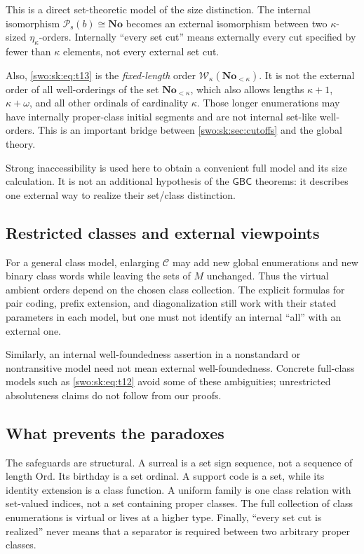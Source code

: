 \documentclass[11pt]{article}
\theoremstyle{definition}
\theoremstyle{remark}
\newcommand{\No}{\mathbf{No}}
\newcommand{\Ord}{\mathrm{Ord}}
\newcommand{\W}{\mathcal W}
\newcommand{\Psupp}{\mathcal P_{\mathrm{s}}}
\newcommand{\GBC}{\mathsf{GBC}}
\begin{document}
This is a direct set-theoretic model of the size distinction. The
internal isomorphism $\Psupp(b)\cong\No$ becomes an external isomorphism
between two $\kappa$-sized $\eta_\kappa$-orders. Internally ``every set
cut'' means externally every cut specified by fewer than $\kappa$
elements, not every external set cut.

Also, \eqref{swo:sk:eq:t13} is the \emph{fixed-length} order
$\W_\kappa(\No_{<\kappa})$. It is not the external order of all
well-orderings of the set $\No_{<\kappa}$, which also allows lengths
$\kappa+1$, $\kappa+\omega$, and all other ordinals of cardinality
$\kappa$. Those longer enumerations may have internally proper-class
initial segments and are not internal set-like well-orders. This is
an important bridge between \cref{swo:sk:sec:cutoffs} and the global theory.

Strong inaccessibility is used here to obtain a convenient full model
and its size calculation. It is not an additional hypothesis of the
$\GBC$ theorems: it describes one external way to realize their
set/class distinction.

\subsection{Restricted classes and external viewpoints}

For a general class model, enlarging $\mathcal C$ may add new global
enumerations and new binary class words while leaving the sets of $M$
unchanged. Thus the virtual ambient orders depend on the chosen class
collection. The explicit formulas for pair coding, prefix extension,
and diagonalization still work with their stated parameters in each
model, but one must not identify an internal ``all'' with an external
one.

Similarly, an internal well-foundedness assertion in a nonstandard or
nontransitive model need not mean external well-foundedness. Concrete
full-class models such as \eqref{swo:sk:eq:t12} avoid some of these ambiguities;
unrestricted absoluteness claims do not follow from our proofs.

\subsection{What prevents the paradoxes}

The safeguards are structural. A surreal is a set sign sequence,
not a sequence of length $\Ord$. Its birthday is a set ordinal.
A support code is a set, while its identity extension is a class
function. A uniform family is one class relation with set-valued
indices, not a set containing proper classes. The full collection of
class enumerations is virtual or lives at a higher type. Finally,
``every set cut is realized'' never means that a separator is required
between two arbitrary proper classes.
\end{document}
